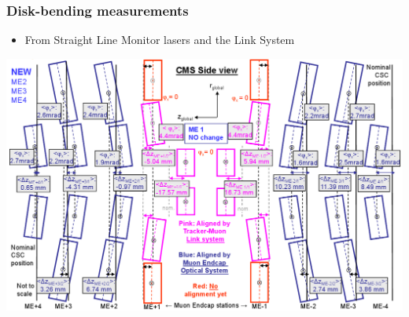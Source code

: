 \documentclass[compress]{beamer}
\begin{document}
\begin{frame}
\frametitle{Disk-bending measurements}
\begin{itemize}
\item From Straight Line Monitor lasers and the Link System
\end{itemize}

\begin{center}\includegraphics[width=\linewidth]{hardware_alignment.png}\end{center}
\end{frame}
\end{document}
